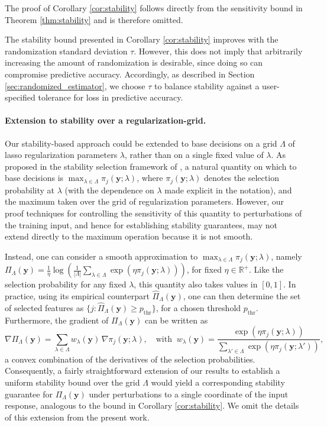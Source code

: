 \documentclass[12pt]{article}
\theoremstyle{definition}
\begin{document}
The proof of Corollary \ref{cor:stability} follows directly from the sensitivity bound in Theorem \ref{thm:stability} and is therefore omitted.

The stability bound presented in Corollary \ref{cor:stability} improves with the randomization standard deviation $\tau$.
However, this does not imply that arbitrarily increasing the amount of randomization is desirable, since doing so can compromise predictive accuracy.
Accordingly, as described in Section \ref{sec:randomized_estimator}, we choose $\tau$ to balance stability against a user-specified tolerance for loss in predictive accuracy.

\paragraph{Extension to stability over a regularization-grid.} Our stability-based approach could be extended to base decisions on a grid $\Lambda$ of lasso regularization parameters $\lambda$, rather than on a single fixed value of $\lambda$.
As proposed in the stability selection framework of \cite{meinshausen2010stability}, a natural quantity on which to base decisions is $\displaystyle\max_{\lambda\in\Lambda}\pi_j(\bm{y}; \lambda)$, where $\pi_j(\bm{y}; \lambda)$ denotes the selection probability at $\lambda$ (with the dependence on $\lambda$ made explicit in the notation), and the maximum taken over the grid of regularization parameters.
However, our proof techniques for controlling the sensitivity of this quantity to perturbations of the training input, and hence for establishing stability guarantees, may not extend directly to the maximum operation because it is not smooth.

Instead, one can consider a smooth approximation to $\displaystyle\max_{\lambda\in\Lambda}\pi_j(\bm{y}; \lambda)$, namely $\Pi_{\Lambda}(\bm{y})=\frac{1}{\eta}\log\left(\frac{1}{|\Lambda|}\sum_{\lambda\in\Lambda}\exp\left(\eta\pi_j(\bm{y}; \lambda)\right)\right)$, for fixed $\eta \in \mathbb{R}^{+}$. 
Like the selection probability for any fixed $\lambda$, this quantity also takes values in $[0,1]$.
In practice, using its empirical counterpart $\widehat\Pi_{\Lambda}(\bm{y})$, one can then determine the set of selected features as $\{j: \widehat{\Pi}_{\Lambda}(\bm{y}) \geq p_{\text{thr}}\}$, for a chosen threshold $p_{\text{thr}}$.
 Furthermore, the gradient of $\Pi_{\Lambda}(\bm{y})$ can be written as
$$\nabla\Pi_{\Lambda}(\bm y)
=
\sum_{\lambda\in\Lambda}
w_{\lambda}(\bm y)\,
\nabla\pi_j(\bm y;\lambda), \quad \text{with } \ w_{\lambda}(\bm y)
=
\dfrac{\exp\!\left(\eta\pi_j(\bm y;\lambda)\right)}
{\sum_{\lambda'\in\Lambda}\exp\!\left(\eta\pi_j(\bm y;\lambda')\right)},
$$
a convex combination of the derivatives of the selection probabilities. 
Consequently, a fairly straightforward extension of our results to establish a uniform stability bound over the grid $\Lambda$ would yield a corresponding stability guarantee for $\Pi_{\Lambda}(\bm{y})$ under perturbations to a single coordinate of the input response, analogous to the bound in Corollary \ref{cor:stability}.
We omit the details of this extension from the present work.
\end{document}
